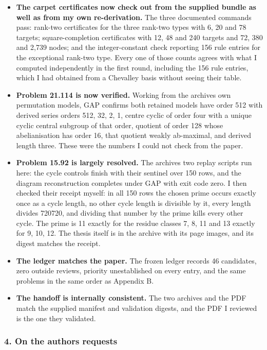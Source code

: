 \begin{itemize}
\tightlist
\item
  \textbf{The carpet certificates now check out from the supplied bundle
  as well as from my own re-derivation.} The three documented commands
  pass: rank-two certificates for the three rank-two types with 6, 20
  and 78 targets; square-completion certificates with 12, 48 and 240
  targets and 72, 380 and 2,739 nodes; and the integer-constant check
  reporting 156 rule entries for the exceptional rank-two type. Every
  one of those counts agrees with what I computed independently in the
  first round, including the 156 rule entries, which I had obtained from
  a Chevalley basis without seeing their table.
\item
  \textbf{Problem 21.114 is now verified.} Working from the
  archive\textquotesingle s own permutation models, GAP confirms both
  retained models have order 512 with derived series orders 512, 32, 2,
  1, centre cyclic of order four with a unique cyclic central subgroup
  of that order, quotient of order 128 whose abelianisation has order
  16, that quotient weakly ab-maximal, and derived length three. These
  were the numbers I could not check from the paper.
\item
  \textbf{Problem 15.92 is largely resolved.} The
  archive\textquotesingle s two replay scripts run here: the cycle
  controls finish with their sentinel over 150 rows, and the diagram
  reconstruction completes under GAP with exit code zero. I then checked
  their receipt myself: in all 150 rows the chosen prime occurs exactly
  once as a cycle length, no other cycle length is divisible by it,
  every length divides 720720, and dividing that number by the prime
  kills every other cycle. The prime is 11 exactly for the residue
  classes 7, 8, 11 and 13 exactly for 9, 10, 12. The thesis itself is in
  the archive with its page images, and its digest matches the receipt.
\item
  \textbf{The ledger matches the paper.} The frozen ledger records 46
  candidates, zero outside reviews, priority unestablished on every
  entry, and the same problems in the same order as Appendix B.
\item
  \textbf{The handoff is internally consistent.} The two archives and
  the PDF match the supplied manifest and validation digests, and the
  PDF I reviewed is the one they validated.
\end{itemize}

\hypertarget{review2-md-on-the-authors-requests}{%
\subsubsection*{4. On the authors\textquotesingle{}
requests}\label{review2-md-on-the-authors-requests}}

